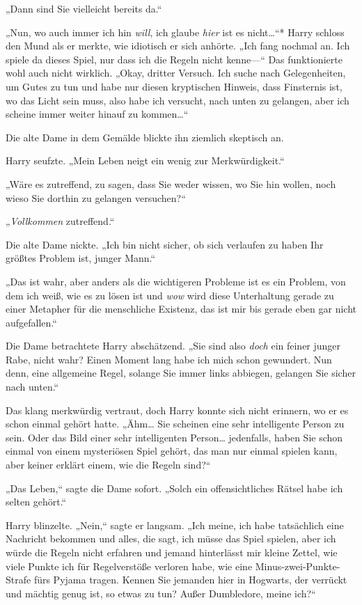 {„Dann sind Sie vielleicht bereits da.“

„Nun, wo auch immer ich hin \emph{will}, ich glaube \emph{hier} ist es nicht…“* Harry schloss den Mund als er merkte, wie idiotisch er sich anhörte. „Ich fang nochmal an. Ich spiele da dieses Spiel, nur dass ich die Regeln nicht kenne—“ Das funktionierte wohl auch nicht wirklich. „Okay, dritter Versuch. Ich suche nach Gelegenheiten, um Gutes zu tun und habe nur diesen kryptischen Hinweis, dass Finsternis ist, wo das Licht sein muss, also habe ich versucht, nach unten zu gelangen, aber ich scheine immer weiter hinauf zu kommen…“

Die alte Dame in dem Gemälde blickte ihn ziemlich skeptisch an.

Harry seufzte. „Mein Leben neigt ein wenig zur Merkwürdigkeit.“

„Wäre es zutreffend, zu sagen, dass Sie weder wissen, wo Sie hin wollen, noch wieso Sie dorthin zu gelangen versuchen?“

„\emph{Vollkommen} zutreffend.“

Die alte Dame nickte. „Ich bin nicht sicher, ob sich verlaufen zu haben Ihr größtes Problem ist, junger Mann.“

„Das ist wahr, aber anders als die wichtigeren Probleme ist es ein Problem, von dem ich weiß, wie es zu lösen ist und \emph{wow} wird diese Unterhaltung gerade zu einer Metapher für die menschliche Existenz, das ist mir bis gerade eben gar nicht aufgefallen.“

Die Dame betrachtete Harry abschätzend. „Sie sind also \emph{doch} ein feiner junger Rabe, nicht wahr? Einen Moment lang habe ich mich schon gewundert. Nun denn, eine allgemeine Regel, solange Sie immer links abbiegen, gelangen Sie sicher nach unten.“

Das klang merkwürdig vertraut, doch Harry konnte sich nicht erinnern, wo er es schon einmal gehört hatte. „Ähm… Sie scheinen eine sehr intelligente Person zu sein. Oder das Bild einer sehr intelligenten Person… jedenfalls, haben Sie schon einmal von einem mysteriösen Spiel gehört, das man nur einmal spielen kann, aber keiner erklärt einem, wie die Regeln sind?“

„Das Leben,“ sagte die Dame sofort. „Solch ein offensichtliches Rätsel habe ich selten gehört.“

Harry blinzelte. „Nein,“ sagte er langsam. „Ich meine, ich habe tatsächlich eine Nachricht bekommen und alles, die sagt, ich müsse das Spiel spielen, aber ich würde die Regeln nicht erfahren und jemand hinterlässt mir kleine Zettel, wie viele Punkte ich für Regelverstöße verloren habe, wie eine Minus-zwei-Punkte-Strafe fürs Pyjama tragen. Kennen Sie jemanden hier in Hogwarts, der verrückt und mächtig genug ist, so etwas zu tun? Außer Dumbledore, meine ich?“

}
